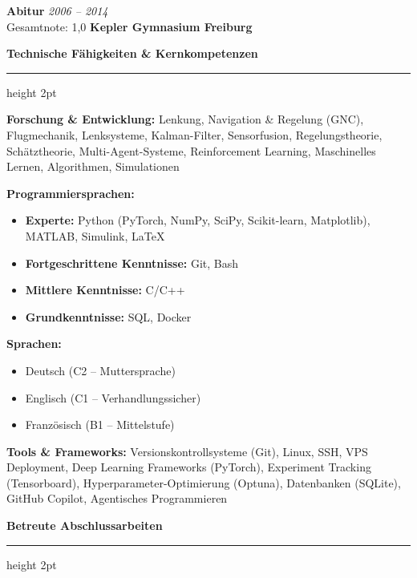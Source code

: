 \documentclass[11pt,a4paper]{article}
\newcommand{\sectiontitle}[1]{%
    \vspace{6pt}
    {\Large\bfseries\color{darkblue}#1}
    \nopagebreak
    \vspace{3pt}
    {\color{accentgreen}\hrule height 2pt}
    \vspace{4pt}
}
\newcommand{\degreeline}[4]{%
    \textbf{#1} \hfill \textit{\small #2}\\
    {\small #3} \hfill {\color{darkblue}\textbf{#4}}\\[3pt]
}
\begin{document}
\vspace{5pt}

\degreeline{Abitur}{2006 -- 2014}{Gesamtnote: 1,0}{Kepler Gymnasium Freiburg}

\vspace{15pt}


\sectiontitle{Technische Fähigkeiten \& Kernkompetenzen}


\textbf{Forschung \& Entwicklung:}  
Lenkung, Navigation \& Regelung (GNC), Flugmechanik, Lenksysteme, Kalman-Filter, Sensorfusion, Regelungstheorie, Schätztheorie, Multi-Agent-Systeme, Reinforcement Learning, Maschinelles Lernen, Algorithmen, Simulationen

\vspace{0.5em}



\vspace{6pt}

\textbf{Programmiersprachen:}
\begin{itemize}
    \item \textbf{Experte:} Python (PyTorch, NumPy, SciPy, Scikit-learn, Matplotlib), MATLAB, Simulink, \LaTeX
    \item \textbf{Fortgeschrittene Kenntnisse:} Git, Bash
    \item \textbf{Mittlere Kenntnisse:} C/C++
    \item \textbf{Grundkenntnisse:} SQL, Docker
\end{itemize}

\vspace{6pt}

\textbf{Sprachen:}
\begin{itemize}
    \item Deutsch (C2 -- Muttersprache)
    \item Englisch (C1 -- Verhandlungssicher)
    \item Französisch (B1 -- Mittelstufe)
\end{itemize}

\vspace{6pt}

\textbf{Tools \& Frameworks:}  
Versionskontrollsysteme (Git), Linux, SSH, VPS Deployment, Deep Learning Frameworks (PyTorch), Experiment Tracking (Tensorboard), Hyperparameter-Optimierung (Optuna),  Datenbanken (SQLite), GitHub Copilot, Agentisches Programmieren


\vspace{15pt}

\sectiontitle{Betreute Abschlussarbeiten}
\end{document}
